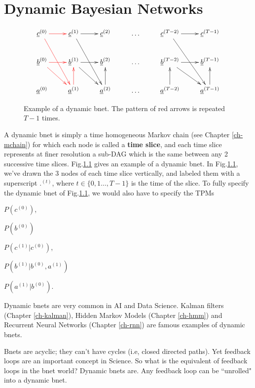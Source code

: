 \chapter{Dynamic Bayesian Networks}
\label{ch-dyn-bnet}

\begin{figure}[h!]
$$
\xymatrix{
\rvc^{(0)}\ar@[red][r]\ar@[red][rdd]
&\rvc^{(1)}\ar[r]\ar[rdd]
&\rvc^{(2)}
&\ldots
&\rvc^{(T-2)}\ar[r]\ar[rdd]
&\rvc^{(T-1)}
\\
\rvb^{(0)}\ar@[red][rd]\ar@[red][r]
&\rvb^{(1)}\ar[rd]\ar[r]
&\rvb^{(2)}
&\ldots
&\rvb^{(T-2)}\ar[rd]\ar[r]
&\rvb^{(T-1)}
\\
\rva^{(0)}
&\rva^{(1)}\ar@[red][u]
&\rva^{(2)}\ar[u]
&\ldots
&\rva^{(T-2)}\ar[u]
&\rva^{(T-1)}\ar[u]
}$$
\caption{
Example of a dynamic bnet. The 
pattern of red arrows is repeated $T-1$ times.
}
\label{fig-dyn-bnet}
\end{figure}

A dynamic bnet is simply
a time homogeneous Markov chain (see Chapter
\ref{ch-mchain})
for which each node is 
called a {\bf time slice},
and each time slice 
represents
at finer resolution a sub-DAG
which is the same 
between any
2 successive time slices.
Fig.\ref{fig-dyn-bnet} gives an example
of a dynamic bnet.
In Fig.\ref{fig-dyn-bnet},
we've drawn the 3 nodes of
each time slice vertically,
and labeled them
with a superscript ${.}^{(t)}$,
where $t\in \{
0,1 \ldots, T-1\}$ 
is the time
of the slice.
To fully 
specify the
dynamic bnet
of Fig.\ref{fig-dyn-bnet},
we would also have to specify
the TPMs 

$P(c^{(0)})$, 

$P(b^{(0)})$

$P(c^{(1)}|c^{(0)})$,
 
$P(b^{(1)}|b^{(0)}, a^{(1)})$

$P(a^{(1)}|b^{(0)})$.

Dynamic
bnets 
are very common
in AI and Data Science.
Kalman filters (Chapter \ref{ch-kalman}),
Hidden Markov Models (Chapter \ref{ch-hmm})
and
Recurrent Neural Networks 
(Chapter \ref{ch-rnn})
are famous examples of dynamic
bnets.

Bnets are acyclic; they can't have cycles
(i.e, closed directed paths).
Yet feedback loops are an important
concept in Science. So what is
the equivalent of feedback loops in the
bnet world? Dynamic bnets are.
Any feedback loop
can be ``unrolled" into a dynamic bnet.